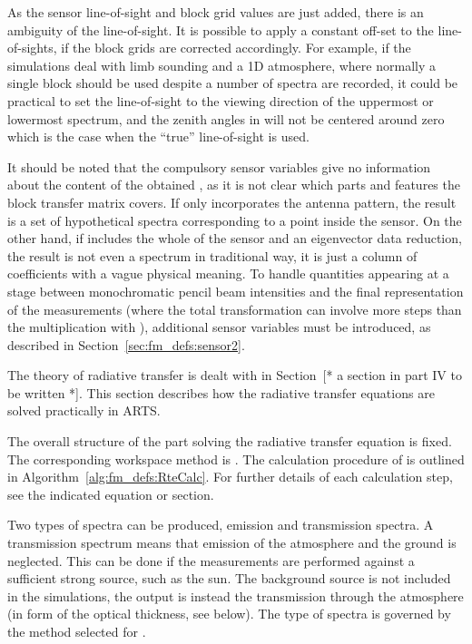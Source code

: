 As the sensor line-of-sight and block grid values are just added,
there is an ambiguity of the line-of-sight. It is possible to apply a
constant off-set to the line-of-sights, if the block grids are
corrected accordingly. For example, if the simulations deal with limb
sounding and a 1D atmosphere, where normally a single block should be
used despite a number of spectra are recorded, it could be practical
to set the line-of-sight to the viewing direction of the uppermost or
lowermost spectrum, and the zenith angles in 
will not be centered around zero which is the case when the ``true''
line-of-sight is used.

It should be noted that the compulsory sensor variables give no
information about the content of the obtained \MsrVct, as it is not
clear which parts and features the block transfer matrix covers. If
 only incorporates the antenna pattern, the result is a set
of hypothetical spectra corresponding to a point inside the sensor. On
the other hand, if  includes the whole of the sensor and an
eigenvector data reduction, the result is not even a spectrum in
traditional way, it is just a column of coefficients with a vague
physical meaning. To handle quantities appearing at a stage between
monochromatic pencil beam intensities and the final representation of
the measurements (where the total transformation can involve more
steps than the multiplication with ), additional sensor
variables must be introduced, as described in
Section~\ref{sec:fm_defs:sensor2}.


\label{sec:fm_defs:rte}

The theory of radiative transfer is dealt with in Section~[* a section
in part IV to be written *]. This section describes how the radiative
transfer equations are solved practically in ARTS.


\label{sec:fm_defs:calcproc}

The overall structure of the part solving the radiative transfer
equation is fixed. The corresponding workspace method is
. The calculation procedure of  is
outlined in Algorithm~\ref{alg:fm_defs:RteCalc}. For further details
of each calculation step, see the indicated equation or section.

Two types of spectra can be produced, emission and transmission
spectra. A transmission spectrum means that emission of the atmosphere
and the ground is neglected. This can be done if the measurements are
performed against a sufficient strong source, such as the sun. The
background source is not included in the simulations, the output is
instead the transmission through the atmosphere (in form of the
optical thickness, see below). The type of spectra is governed by the
method selected for .

